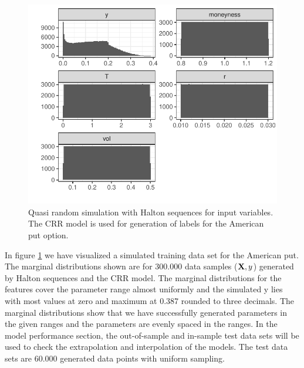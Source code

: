 \begin{figure}[th]
\centering
\includegraphics{Figures/marginalAmerPut.pdf}
\decoRule
\caption[Marginal Distributions for American Put]{Quasi random simulation with Halton sequences for input variables. The CRR model is used for generation of labels for the American put option.}
\label{fig:marginalAmerPut}
\end{figure}

In figure \ref{fig:marginalAmerPut} we have visualized a simulated training data set for the American put. The marginal distributions shown are for $300.000$ data samples ($\mathbf{X},y$) generated by Halton sequences and the CRR model. The marginal distributions for the features cover the parameter range almost uniformly and the simulated y lies with most values at zero and maximum at 0.387 rounded to three decimals. The marginal distributions show that we have successfully generated parameters in the given ranges and the parameters are evenly spaced in the ranges. In the model performance section, the out-of-sample and in-sample test data sets will be used to check the extrapolation and interpolation of the models. The test data sets are 60.000 generated data points with uniform sampling.


